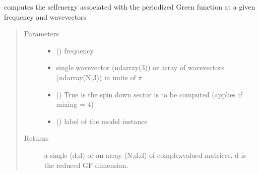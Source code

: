 \documentclass[letterpaper,10pt,english]{sphinxmanual}
\begin{document}
\begin{fulllineitems}
\label{\detokenize{functions:pyqcm.self_energy}}
\sphinxAtStartPar
computes the self\sphinxhyphen{}energy associated with the periodized Green function at a given frequency and wavevectors
\begin{quote}\begin{description}
\item[{Parameters}] \leavevmode\begin{itemize}
\item {} 
\sphinxAtStartPar
{} () \textendash{} frequency

\item {} 
\sphinxAtStartPar
{} \textendash{} single wavevector (ndarray(3)) or array of wavevectors (ndarray(N,3)) in units of \(\pi\)

\item {} 
\sphinxAtStartPar
{} () \textendash{} True is the spin down sector is to be computed (applies if mixing = 4)

\item {} 
\sphinxAtStartPar
{} () \textendash{} label of the model instance

\end{itemize}

\item[{Returns}] \leavevmode
\sphinxAtStartPar
a single (d,d) or an array (N,d,d) of complex\sphinxhyphen{}valued matrices. d is the reduced GF dimension.

\end{description}\end{quote}

\end{fulllineitems}

\end{document}
